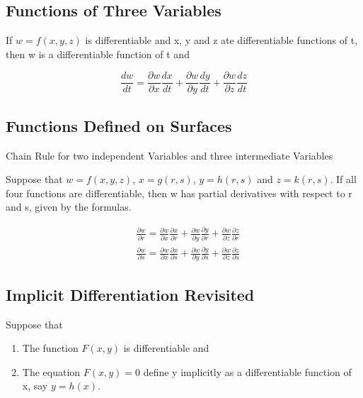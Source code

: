 \documentclass[12pt,a4paper,draft]{article}
\newenvironment{theorem}{\begin{theorembox}}{\end{theorembox}\vspace{1\baselineskip}}
\begin{document}
\subsection{Functions of Three Variables}

\begin{theorem}
    If \(w = f(x,y,z)\) is differentiable and x, y and z ate differentiable functions of t, then w is a differentiable function of t and
    
    \[\frac{d w}{d t}=\frac{\partial w}{\partial x} \frac{d x}{d t}+\frac{\partial w}{\partial y} \frac{d y}{d t}+\frac{\partial w}{\partial z} \frac{d z}{d t}\]

\end{theorem}

\subsection{Functions Defined on Surfaces}

\begin{theorem}
    Chain Rule for two independent Variables and three intermediate Variables

    Suppose that \(w = f(x,y,z)\), \(x= g(r,s)\), \(y= h(r,s)\) and \(z= k(r,s)\). If all four
    functions are differentiable, then w has partial derivatives with respect to r and s,
    given by the formulas.

    \[\begin{aligned}
        & \frac{\partial w}{\partial r}=\frac{\partial w}{\partial x} \frac{\partial x}{\partial r}+\frac{\partial w}{\partial y} \frac{\partial y}{\partial r}+\frac{\partial w}{\partial z} \frac{\partial z}{\partial r} \\
        & \frac{\partial w}{\partial s}=\frac{\partial w}{\partial x} \frac{\partial x}{\partial s}+\frac{\partial w}{\partial y} \frac{\partial y}{\partial s}+\frac{\partial w}{\partial z} \frac{\partial z}{\partial s}
        \end{aligned}\]

\end{theorem}



\subsection{Implicit Differentiation Revisited}

Suppose that

\begin{enumerate}
    \item The function \(F(x,y)\) is differentiable and
    \item The equation \(F(x,y) = 0\) define y implicitly as a differentiable function of x, say \(y= h(x)\).

\end{enumerate}
\end{document}
